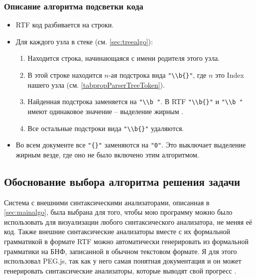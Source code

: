 \documentclass[a4paper,12pt]{article}
\begin{document}
  \subsubsection{Описание алгоритма подсветки кода}
  \label{sec:rtfalgo}
  \begin{itemize}
    \item RTF код разбивается на строки.
    \item Для каждого узла в стеке (см. \autoref{sec:treealgo}):
    \begin{enumerate}
      \item Находится строка, начинающаяся с имени родителя этого узла.
      \item В этой строке находится $n$-ая подстрока вида \texttt{"{}\textbackslash{}\textbackslash{}b\{\}"{}},
      где $n$ это Index нашего узла (см. \autoref{tabpropParserTreeToken}).
      \item Найденная подстрока заменяется на \texttt{"{}\textbackslash{}\textbackslash{}b "{}}.
      В RTF \texttt{"{}\textbackslash{}\textbackslash{}b\{\}"{}} и \texttt{"{}\textbackslash{}\textbackslash{}b "{}}
      имеют одинаковое значение -- выделение жирным \cite{rtf}.
      \item Все остальные подстроки вида \texttt{"{}\textbackslash{}\textbackslash{}b\{\}"{}} удаляются.
    \end{enumerate}
    \item Во всем документе все \texttt{"{}\{\}"{}} заменяются на \texttt{"{}0"{}}.
    Это выключает выделение жирным везде, где оно не было включено этим алгоритмом.
  \end{itemize}

  \subsection{Обоснование выбора алгоритма решения задачи}
  Система с внешними синтаксическими анализаторами, описанная в \autoref{sec:mainalgo}, была выбрана
  для того, чтобы мою программу можно было использовать для визуализации любого синтаксического анализатора, не меняя её код.
  Также внешние синтаксические анализаторы вместе с их формальной грамматикой в формате RTF
  можно автоматически генерировать из формальной грамматики на БНФ, записанной в обычном текстовом формате.
  Я для этого использовал PEG.js, так как у него самая понятная документация
  и он может генерировать синтаксические анализаторы, которые выводят свой прогресс \cite{pegjs}.
\end{document}
